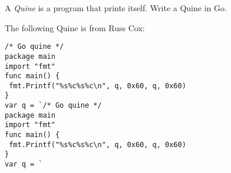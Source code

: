 \begin{Exercise}[title={Quine},difficulty=9]
A \emph{Quine} is a program that prints itself.
\label{ex:quine}
\Question\label{ex:quine q1} Write a Quine in Go.
\end{Exercise}

\begin{Answer}
\Question The following Quine is from Russ Cox:
\begin{lstlisting}
/* Go quine */
package main
import "fmt"
func main() {
 fmt.Printf("%s%c%s%c\n", q, 0x60, q, 0x60)
}
var q = `/* Go quine */
package main
import "fmt"
func main() {
 fmt.Printf("%s%c%s%c\n", q, 0x60, q, 0x60)
}
var q = `
\end{lstlisting}
\end{Answer}
